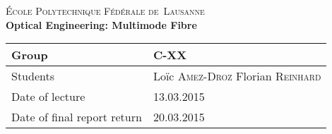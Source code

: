 \begin{titlepage}
\begin{center}
    \textsc{\LARGE École Polytechnique Fédérale de~Lausanne}\\[1.5cm] 
    {\huge \bfseries Optical Engineering: Multimode Fibre}\\[0.4cm] 
    \begin{tabular}{|p{5cm}|p{4cm}|}
        \hline
        Group & C-XX \\ \hline
        Students & Loïc \textsc{Amez-Droz} \newline Florian \textsc{Reinhard} \\ \hline
        Date of lecture & 13.03.2015 \\ \hline
        Date of final report return & 20.03.2015 \\ \hline
    \end{tabular}
\end{center}


\begin{abstract}
    \lipsum[3]
\end{abstract}
 
\vfill
\end{titlepage}

